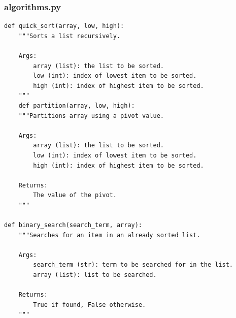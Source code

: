 \documentclass[twoside, 12pt]{report}
\begin{document}
\subsubsection{algorithms.py}
\begin{verbatim}
def quick_sort(array, low, high):
	"""Sorts a list recursively.

	Args:
		array (list): the list to be sorted.
		low (int): index of lowest item to be sorted.
		high (int): index of highest item to be sorted.
	"""
	def partition(array, low, high):
	"""Partitions array using a pivot value.
	
	Args:
		array (list): the list to be sorted.
		low (int): index of lowest item to be sorted.
		high (int): index of highest item to be sorted.
	
	Returns:
		The value of the pivot.
	"""

def binary_search(search_term, array):
	"""Searches for an item in an already sorted list.

	Args:
		search_term (str): term to be searched for in the list.
		array (list): list to be searched.
	
	Returns:
		True if found, False otherwise.
	"""
\end{verbatim}
\end{document}

